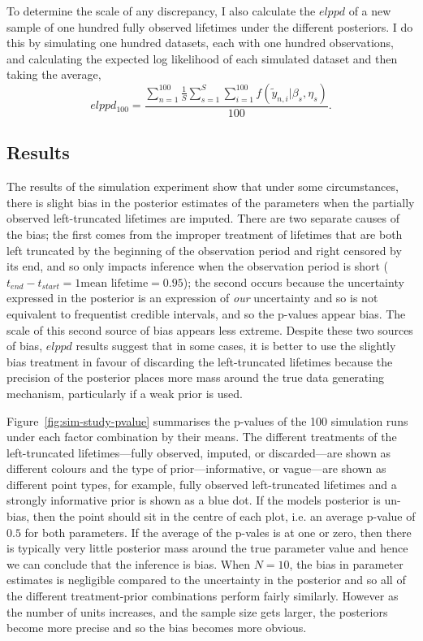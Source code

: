 To determine the scale of any discrepancy, I also calculate the $elppd$ of a new sample of one hundred fully observed lifetimes under the different posteriors. I do this by simulating one hundred datasets, each with one hundred observations, and calculating the expected log likelihood of each simulated dataset and then taking the average,
\begin{equation*}
    \label{eq:elppd-100}
    elppd_{100} = \frac{\sum_{n = 1}^{100}\frac{1}{S}\sum_{s = 1}^{S}\sum_{i = 1}^{100}f(\tilde{y}_{n, i}|\beta_s, \eta_s)}{100}.
\end{equation*}

\subsection{Results}

The results of the simulation experiment show that under some circumstances, there is slight bias in the posterior estimates of the parameters when the partially observed left-truncated lifetimes are imputed. There are two separate causes of the bias; the first comes from the improper treatment of lifetimes that are both left truncated by the beginning of the observation period and right censored by its end, and so only impacts inference when the observation period is short ($t_{end} - t_{start} = 1 \text{mean lifetime} = 0.95$); the second occurs because the uncertainty expressed in the posterior is an expression of \textit{our} uncertainty and so is not equivalent to frequentist credible intervals, and so the p-values appear bias. The scale of this second source of bias appears less extreme. Despite these two sources of bias, $elppd$ results suggest that in some cases, it is better to use the slightly bias treatment in favour of discarding the left-truncated lifetimes because the precision of the posterior places more mass around the true data generating mechanism, particularly if a weak prior is used.

Figure~\ref{fig:sim-study-pvalue} summarises the p-values of the 100 simulation runs under each factor combination by their means. The different treatments of the left-truncated lifetimes---fully observed, imputed, or discarded---are shown as different colours and the type of prior---informative, or vague---are shown as different point types, for example, fully observed left-truncated lifetimes and a strongly informative prior is shown as a blue dot. If the models posterior is un-bias, then the point should sit in the centre of each plot, i.e. an average p-value of $0.5$ for both parameters. If the average of the p-vales is at one or zero, then there is typically very little posterior mass around the true parameter value and hence we can conclude that the inference is bias. When $N = 10$, the bias in parameter estimates is negligible compared to the uncertainty in the posterior and so all of the different treatment-prior combinations perform fairly similarly. However as the number of units increases, and the sample size gets larger, the posteriors become more precise and so the bias becomes more obvious.

